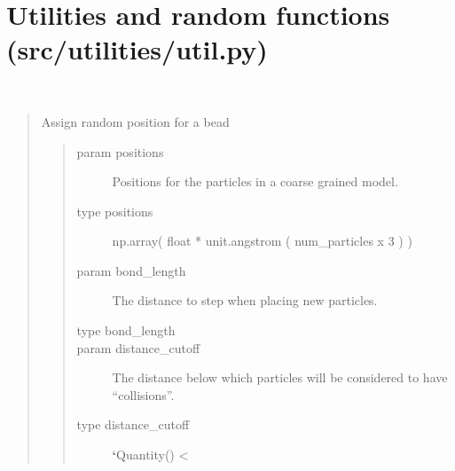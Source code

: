 \documentclass[letterpaper,12pt,english,openany,oneside]{sphinxmanual}
\begin{document}
\section{Utilities and random functions (src/utilities/util.py)}
\label{\detokenize{utilities:module-utilities.util}}\label{\detokenize{utilities:utilities-and-random-functions-src-utilities-util-py}}

\begin{fulllineitems}
\label{\detokenize{utilities:utilities.util.assign_position}}~\begin{quote}

Assign random position for a bead
\begin{quote}\begin{description}
\item[{param positions}] \leavevmode
Positions for the particles in a coarse grained model.

\item[{type positions}] \leavevmode
np.array( float * unit.angstrom ( num\_particles x 3 ) )

\item[{param bond\_length}] \leavevmode
The distance to step when placing new particles.

\item[{type bond\_length}] \leavevmode
{}

\item[{param distance\_cutoff}] \leavevmode
The distance below which particles will be considered to have “collisions”.

\item[{type distance\_cutoff}] \leavevmode
{\color{red}\bfseries{}{}`}Quantity() \textless{}

\end{description}\end{quote}
\end{quote}


\end{fulllineitems}
\end{document}
